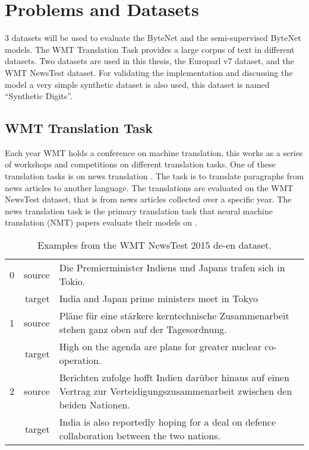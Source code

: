 
\section{Problems and Datasets}

3 datasets will be used to evaluate the ByteNet and the semi-supervised ByteNet models. The WMT Translation Task provides a large corpus of text in different datasets. Two datasets are used in this thesis, the Europarl v7 dataset, and the WMT NewsTest dataset. For validating the implementation and discussing the model a very simple synthetic dataset is also used, this dataset is named ``Synthetic Digits''.

\subsection{WMT Translation Task}

Each year WMT holds a conference on machine translation, this works as a series of workshops and competitions on different translation tasks. One of these translation tasks is on news translation \cite{wmt16}. The task is to translate paragraphs from news articles to another language. The translations are evaluated on the WMT NewsTest dataset, that is from news articles collected over a specific year. The news translation task is the primary translation task that neural machine translation (NMT) papers evaluate their models on \cite{bytenet, bahdanau-2015-nmt, sutskever-2014-nmt}.

\begin{table}[H]
\centering
\begin{tabular}{l|r|p{10cm}}
     0 & source & Die Premierminister Indiens und Japans trafen sich in Tokio. \\[0.1cm]
       & target & India and Japan prime ministers meet in Tokyo \\[0.1cm] \hline
     1 & source & Pläne für eine stärkere kerntechnische Zusammenarbeit stehen ganz oben auf der Tagesordnung. \\[0.1cm]
       & target & High on the agenda are plans for greater nuclear co-operation. \\[0.1cm] \hline
     2 & source & Berichten zufolge hofft Indien darüber hinaus auf einen Vertrag zur Verteidigungszusammenarbeit zwischen den beiden Nationen. \\[0.1cm]
       & target & India is also reportedly hoping for a deal on defence collaboration between the two nations.
\end{tabular}
\caption{Examples from the WMT NewsTest 2015 de-en dataset.}
\end{table}

